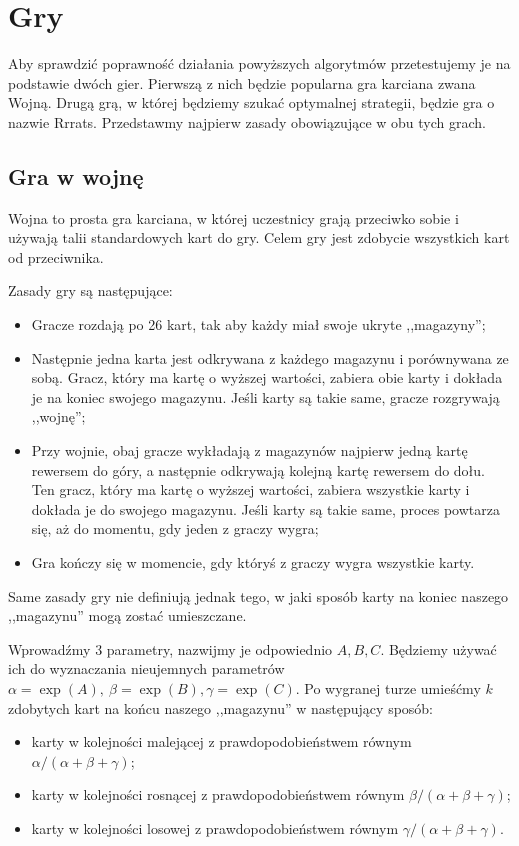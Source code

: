 \documentclass[inzynierska]{pwr_wmat_praca_dyplomowa}
\theoremstyle{plain}
\numberwithin{theorem}{chapter}
\theoremstyle{definition}
\numberwithin{theorem}{chapter}
\begin{document}
	\chapter{Gry}
	Aby sprawdzić poprawność działania powyższych algorytmów przetestujemy je na podstawie dwóch gier. Pierwszą z nich będzie popularna gra karciana zwana Wojną. Drugą grą, w której będziemy szukać optymalnej strategii, będzie gra o nazwie Rrrats. Przedstawmy najpierw zasady obowiązujące w obu tych grach.

	\section{Gra w wojnę}
	Wojna to prosta gra karciana, w której uczestnicy grają przeciwko sobie i używają talii standardowych kart do gry. Celem gry jest zdobycie wszystkich kart od przeciwnika.
	
	Zasady gry są następujące:
	\begin{itemize}
		\item 	Gracze rozdają po 26 kart, tak aby każdy miał swoje ukryte ,,magazyny'';
		
		\item Następnie jedna karta jest odkrywana z każdego magazynu i porównywana ze sobą. Gracz, który ma kartę o wyższej wartości, zabiera obie karty i dokłada je na koniec swojego magazynu. Jeśli karty są takie same, gracze rozgrywają ,,wojnę'';
		
		\item Przy wojnie, obaj gracze wykładają z magazynów najpierw jedną kartę rewersem do góry, a następnie odkrywają kolejną kartę rewersem do dołu. Ten gracz, który ma kartę o wyższej wartości, zabiera wszystkie karty i dokłada je do swojego magazynu. Jeśli karty są takie same, proces powtarza się, aż do momentu, gdy jeden z graczy wygra;
		
		\item Gra kończy się w momencie, gdy któryś z graczy wygra wszystkie karty.
	\end{itemize}
	Same zasady gry nie definiują jednak tego, w jaki sposób karty na koniec naszego ,,magazynu'' mogą zostać umieszczane.
	
	Wprowadźmy 3 parametry, nazwijmy je odpowiednio $A, B, C$. Będziemy używać ich do wyznaczania nieujemnych parametrów $\alpha = \exp(A), \
	\beta= \exp(B), \gamma= \exp(C)$. Po wygranej turze umieśćmy $k$ zdobytych kart na końcu naszego ,,magazynu'' w następujący sposób:
	\begin{itemize}
		\item karty w kolejności malejącej z prawdopodobieństwem równym $\alpha/(\alpha+\beta+\gamma)$;
		
		\item karty w kolejności rosnącej z prawdopodobieństwem równym $\beta/(\alpha+\beta+\gamma)$;
		
		\item karty w kolejności losowej z prawdopodobieństwem równym $\gamma/(\alpha+\beta+\gamma)$.
	\end{itemize}
	
\end{document}
